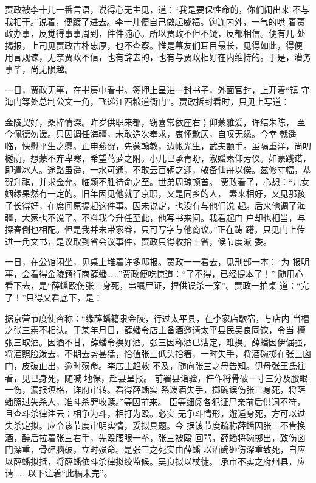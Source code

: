 贾政被李十儿一番言语，说得心无主见，道：“我是要保性命的，你们闹出来
不与我相干。”说着，便踱了进去。李十儿便自己做起威福。钩连内外，一气的哄
着贾政办事，反觉得事事周到，件件随心。所以贾政不但不疑，反都相信。便有几
处揭报，上司见贾政古朴忠厚，也不查察。惟是幕友们耳目最长，见得如此，得便
用言规谏，无奈贾政不信，也有辞去的，也有与贾政相好在内维持的。于是，漕务
事毕，尚无陨越。

一日，贾政无事，在书房中看书。签押上呈进一封书子，外面官封，上开着“镇
守海门等处总制公文一角，飞递江西粮道衙门”。贾政拆封看时，只见上写道：

金陵契好，桑梓情深。昨岁供职来都，窃喜常依座右；仰蒙雅爱，许结朱陈，
至今佩德勿谖。只因调任海疆，未敢造次奉求，衷怀歉仄，自叹无缘。今幸戟遥
临，快慰平生之愿。正申燕贺，先蒙翰教，边帐光生，武夫额手。虽隔重洋，尚叨
樾荫，想蒙不弃卑寒，希望茑萝之附。小儿已承青盼，淑媛素仰芳仪。如蒙践诺，
即遣冰人。途路虽遥，一水可通，不敢云百辆之迎，敬备仙舟以俟。兹修寸幅，恭
贺升祺，并求金允。临颖不胜待命之至。世弟周琼顿首。
贾政看了，心想：“儿女姻缘果然有一定的。旧年因见他就了京职，又是同乡的人，
素来相好，又见那孩子长得好，在席间原提起这件事。因未说定，也没有与他们说
起。后来他调了海疆，大家也不说了。不料我今升任至此，他写书来问。我看起门
户却也相当，与探春倒也相配。但是我并未带家眷，只可写字与他商议。”正在踌
躇，只见门上传进一角文书，是议取到省会议事件，贾政只得收拾上省，候节度派
委。

一日，在公馆闲坐，见桌上堆着许多邸报。贾政一一看去，见刑部一本：“为
报明事，会看得金陵籍行商薛蟠……”贾政便吃惊道：“了不得，已经提本了！”
随用心看下去，是“薛蟠殴伤张三身死，串嘱尸证，捏供误杀一案”。贾政一拍桌
道：“完了！”只得又看底下，是：

据京营节度使咨称：“缘薛蟠籍隶金陵，行过太平县，在李家店歇宿，与店内
当槽之张三素不相认。于某年月日，薛蟠令店主备酒邀请太平县民吴良同饮，令当
槽张三取酒。因酒不甘，薛蟠令换好酒。张三因称酒已沽定，难换。薛蟠因伊倔强，
将酒照脸泼去，不期去势甚猛，恰值张三低头拾箸，一时失手，将酒碗掷在张三囟
门，皮破血出，逾时殒命。李店主趋救
不及，随向张三之母告知。伊母张王氏往看，见已身死，随喊地保，赴县呈报。
前署县诣验，仵作将骨破一寸三分及腰眼一伤，漏报填格，详府审转。看得薛蟠实
系泼酒失手，掷碗误伤张三身死，将薛蟠照过失杀人，准斗杀罪收赎。”等因前来。
臣等细阅各犯证尸亲前后供词不符，且查斗杀律注云：相争为斗，相打为殴。必实
无争斗情形，邂逅身死，方可以过失杀定拟。应令该节度审明实情，妥拟具题。今
据该节度疏称薛蟠因张三不肯换酒，醉后拉着张三右手，先殴腰眼一拳，张三被殴
回骂，薛蟠将碗掷出，致伤囟门深重，骨碎脑破，立时殒命。是张三之死实由薛蟠
以酒碗砸伤深重致死，自应以薛蟠拟抵，将薛蟠依斗杀律拟绞监候。吴良拟以杖徒。
承审不实之府州县，应请……
以下注着“此稿未完”。

